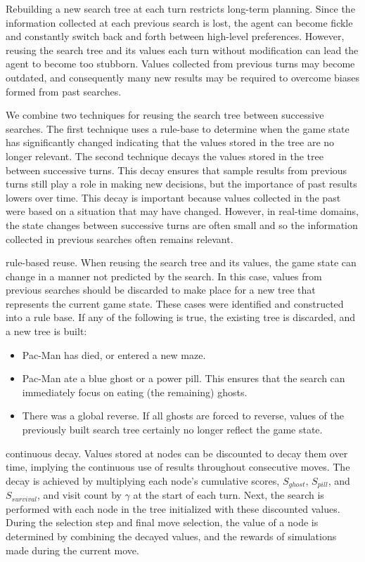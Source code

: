 \documentclass[journal]{IEEEtran}
\begin{document}
Rebuilding a new search tree at each turn restricts long-term planning. Since the information collected at each previous search is lost, the agent can become fickle and constantly switch back and forth between high-level preferences. However, reusing the search tree and its values each turn without modification can lead the agent to become too stubborn. Values collected from previous turns may become outdated, and consequently many new results may be required to overcome biases formed from past searches. 

We combine two techniques for reusing the search tree between successive searches. The first technique uses a rule-base to determine when the game state has significantly changed indicating that the values stored in the tree are no longer relevant. The second technique decays the values stored in the tree between successive turns. This decay ensures that sample results from previous turns still play a role in making new decisions, but the importance of past results lowers over time. This decay is important because values collected in the past were based on a situation that may have changed. However, in real-time domains, the state changes between successive turns are often small and so the information collected in previous searches often remains relevant.  

{\sc rule-based reuse.} When reusing the search tree and its values, the game state can change in a manner not predicted by the search. In this case, values from previous searches should be discarded to make place for a new tree that represents the current game state. These cases were identified and constructed into a rule base. If any of the following is true, the existing tree is discarded, and a new tree is built:
\begin{itemize}
\item Pac-Man has died, or entered a new maze.
\item Pac-Man ate a blue ghost or a power pill. This ensures that the search can immediately focus on eating (the remaining) ghosts.
\item There was a global reverse. If all ghosts are forced to reverse, values of the previously built search tree certainly no longer reflect the game state.
\end{itemize}

{\sc continuous decay.} Values stored at nodes can be discounted to decay them over time, implying the continuous use of results throughout consecutive moves. The decay is achieved by multiplying each node's cumulative scores, $S_{ghost}$, $S_{pill}$, and $S_{survival}$, and visit count by $\gamma$ at the start of each turn. Next, the search is performed with each node in the tree initialized with these discounted values. During the selection step and final move selection, the value of a node is determined by combining the decayed values, and the rewards of simulations made during the current move.
\end{document}
